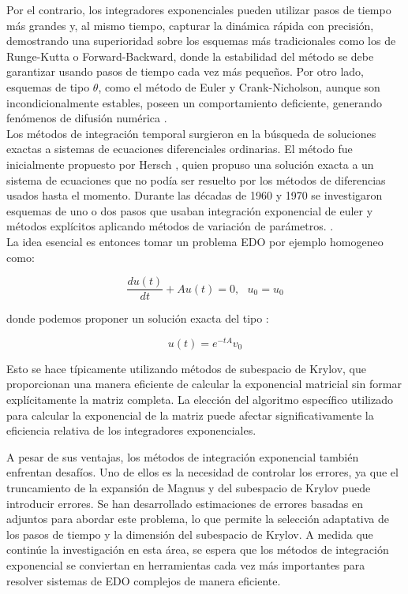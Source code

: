 \documentclass[11pt, spanish]{article}
\begin{document}
Por el contrario, los integradores exponenciales pueden utilizar pasos de tiempo más grandes y, al mismo tiempo, capturar la dinámica rápida con precisión, demostrando una superioridad sobre los esquemas más tradicionales como los de Runge-Kutta o Forward-Backward, donde la estabilidad del método se debe garantizar usando pasos de tiempo cada vez más pequeños. Por otro lado, esquemas de tipo $\theta$, como el método de Euler y Crank-Nicholson, aunque son incondicionalmente estables, poseen un comportamiento deficiente, generando fenómenos de difusión numérica \cite{Brachet2022}.\\

Los métodos de integración temporal surgieron en la búsqueda de soluciones exactas a sistemas de ecuaciones diferenciales ordinarias. El método fue inicialmente propuesto por Hersch \cite{Hersch1958}, quien propuso una solución exacta a un sistema de ecuaciones que no podía ser resuelto por los métodos de diferencias usados hasta el momento. Durante las décadas de 1960 y 1970 se investigaron esquemas de uno o dos pasos que usaban integración exponencial de euler y métodos explícitos aplicando métodos de variación de parámetros.  \cite{Hochbruck2010}.\\

La idea esencial es entonces tomar un problema EDO por ejemplo homogeneo  como: 

\begin{equation}
    \frac{d u(t)}{d t} + Au(t) =0 ,\ \ \  u_0 =u_0 
\end{equation}

donde podemos proponer un solución exacta del tipo : 

\begin{equation}
    u(t) = e^{-tA}v_0 
\end{equation}



Esto se hace típicamente utilizando métodos de subespacio de Krylov, que proporcionan una manera eficiente de calcular la exponencial matricial sin formar explícitamente la matriz completa. La elección del algoritmo específico utilizado para calcular la exponencial de la matriz puede afectar significativamente la eficiencia relativa de los integradores exponenciales.


A pesar de sus ventajas, los métodos de integración exponencial también enfrentan desafíos. Uno de ellos es la necesidad de controlar los errores, ya que el truncamiento de la expansión de Magnus y del subespacio de Krylov puede introducir errores. Se han desarrollado estimaciones de errores basadas en adjuntos para abordar este problema, lo que permite la selección adaptativa de los pasos de tiempo y la dimensión del subespacio de Krylov. A medida que continúe la investigación en esta área, se espera que los métodos de integración exponencial se conviertan en herramientas cada vez más importantes para resolver sistemas de EDO complejos de manera eficiente.
\end{document}
